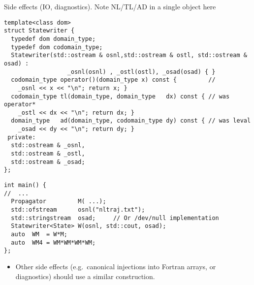\documentclass[9pt]{beamer}
\begin{document}


\begin{frame}[fragile]{Side effects (IO, diagnostics).  Note NL/TL/AD in a single object here} 
\begin{lstlisting} 
template<class dom>
struct Statewriter {
  typedef dom domain_type;
  typedef dom codomain_type;
  Statewriter(std::ostream & osnl,std::ostream & ostl, std::ostream &  osad) : 
                  _osnl(osnl) , _ostl(ostl), _osad(osad) { } 
  codomain_type operator()(domain_type x) const {         // 
    _osnl << x << "\n"; return x; }
  codomain_type tl(domain_type, domain_type   dx) const { // was operator*
    _ostl << dx << "\n"; return dx; }
  domain_type   ad(domain_type, codomain_type dy) const { // was leval
    _osad << dy << "\n"; return dy; }
 private: 
  std::ostream & _osnl, 
  std::ostream & _ostl,
  std::ostream & _osad; 
};
\end{lstlisting}
\pause
\begin{lstlisting} 
int main() {
//  ...
  Propagator         M( ...); 
  std::ofstream      osnl("nltraj.txt"); 
  std::stringstream  osad;     // Or /dev/null implementation 
  Statewriter<State> W(osnl, std::cout, osad);
  auto  WM  = W*M; 
  auto  WM4 = WM*WM*WM*WM; 
};
\end{lstlisting} 

\begin{itemize}
  \item Other side effects (e.g.\ canonical injections into Fortran arrays, or diagnostics) should use a similar construction.   
\end{itemize} 
\end{frame} 
\end{document}
